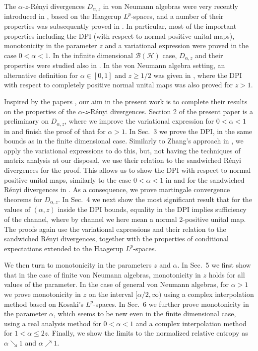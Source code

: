 \documentclass[12pt]{article}
\theoremstyle{definition}
\theoremstyle{remark}
\numberwithin{equation}{section}
\begin{document}
The $\alpha$-$z$-R\'enyi divergences $D_{\alpha,z}$ in von Neumann algebras were very recently
introduced in \cite{kato2023aremark}, {based on the Haagerup $L^p$-spaces}, and a number of
their properties was subsequently proved in \cite{kato2023onrenyi}. In particular, most of the important
properties including the DPI (with respect to normal positive unital maps), monotonicity in the parameter $z$
and a variational expression were proved in the case $0<\alpha<1$. In the infinite dimensional
$\mathcal{B}(\mathcal{H})$ case, $D_{\alpha,z}$ and their properties were studied also in
\cite{mosonyi2023thestrong}.  In the von Neumann algebra setting, an alternative definition for $\alpha\in
[0,1]$ and $z\ge 1/2$ was given in \cite{furuya2023monotonic}, where the DPI with respect
to completely positive normal unital maps was also proved for $z>1$.

Inspired by the papers \cite{kato2023aremark, kato2023onrenyi}, our aim in the present
work is to complete their results on the properties of the $\alpha$-$z$-R\'enyi divergences.
Section 2 of the present paper is a preliminary on $D_{\alpha,z}$, where we improve the
variational expression for $0<\alpha<1$ in \cite{kato2023onrenyi} and finish the proof of that for $\alpha>1$.
In Sec.~3 we prove the DPI, in the same bounds as in the finite dimensional case. Similarly to
Zhang's approach in \cite{zhang2020fromwyd}, we apply the variational expressions to {do} this,
but, not having the techniques of matrix analysis at our disposal,
we use their relation to the sandwiched R\'enyi divergences for the proof. This allows us
to show the DPI with respect to normal positive unital maps, similarly to the case $0<\alpha<1$
in \cite{kato2023onrenyi} and for the sandwiched R\'enyi divergences in
\cite{jencova2018renyi,jencova2021renyi}. As a consequence, we prove martingale convergence
theorems for $D_{\alpha,z}$. In Sec.~4 we next show the most significant result that for the
values of $(\alpha,z)$ inside the DPI bounds, equality in the DPI implies sufficiency of the channel,
where by channel we here mean a normal 2-positive unital map. The proofs again use the variational
expressions and their relation to the sandwiched R\'enyi divergences, together with the properties of
conditional expectations extended to the Haagerup $L^p$-spaces.

We then turn to monotonicity in the parameters $z$ and $\alpha$. In Sec.~5 we first show that in the
case of finite von Neumann algebras,  monotonicity in $z$ holds for all values of the parameter. 
In the case of general von Neumann algebras, for $\alpha>1$ we prove monotonicity in $z$
on the interval $[\alpha/2,\infty)$ using a complex interpolation method
based on Kosaki's $L^p$-spaces. In Sec.~6 we further prove monotonicity in the parameter
$\alpha$, which seems to be new even in the finite dimensional case, using a real analysis method
for $0<\alpha<1$ and a complex interpolation method for $1<\alpha\le2z$. Finally, we show the limits
to the normalized relative entropy as $\alpha\searrow 1$ and $\alpha\nearrow 1$.
\end{document}
